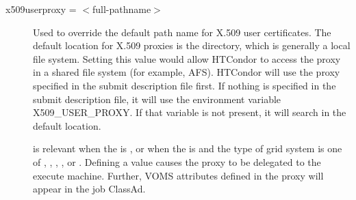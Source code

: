 \begin{description}

\label{condor-submit-x509userproxy}
\item[x509userproxy = $<$full-pathname$>$] Used to override the default
path name for X.509 user certificates. The default location for X.509 proxies
is the  directory,
which is generally a local file system.
Setting
this value would allow HTCondor to access the proxy in a shared file system
(for example, AFS).
HTCondor will use the proxy specified in the submit description file first.
If nothing is specified in the submit description file,
it will use the environment variable X509\_USER\_PROXY.
If that variable is not present,
it will search in the default location.

 is relevant when
the  is ,
or when the  is 
and the type of grid system is one of ,
, , , 
or .
Defining a value causes the proxy to be delegated to the execute machine.
Further, VOMS attributes defined in the proxy will appear in
the job ClassAd.

\end{description} 



